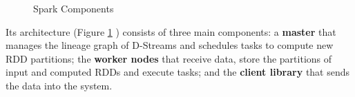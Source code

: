 \documentclass[ppgc,diss,english]{iiufrgs}
\begin{document}
\begin{figure}[ht]
    \centering
    \quad
    \quad
    \caption{Spark Components}
    \label{fig:spark_architecture}
\end{figure}

Its architecture (Figure \ref{fig:spark_architecture} ) consists of three main components: a \textbf{master} that manages the lineage graph of D-Streams and schedules tasks to compute new RDD partitions; the \textbf{worker nodes} that receive data, store the partitions of input and computed RDDs and execute tasks; and the \textbf{client library} that sends the data into the system.
\end{document}
